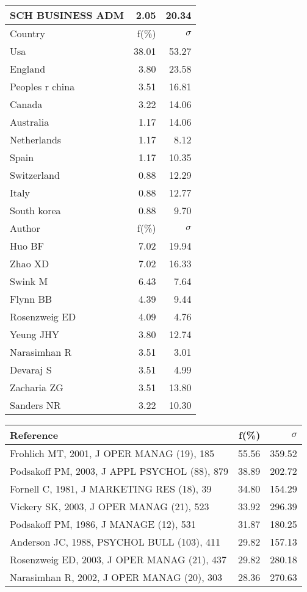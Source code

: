 \documentclass[a4paper,11pt]{report}
\begin{document}
\begin{landscape}
\begin{table}[!ht]
{\begin{tabular}{|l r r|}
SCH BUSINESS ADM & 2.05 & 20.34\\
\hline
\hline
Country & f(\%) & $\sigma$\\
\hline
Usa & 38.01 & 53.27\\
England & 3.80 & 23.58\\
Peoples r china & 3.51 & 16.81\\
Canada & 3.22 & 14.06\\
Australia & 1.17 & 14.06\\
Netherlands & 1.17 & 8.12\\
Spain & 1.17 & 10.35\\
Switzerland & 0.88 & 12.29\\
Italy & 0.88 & 12.77\\
South korea & 0.88 & 9.70\\
\hline
\hline
Author & f(\%) & $\sigma$\\
\hline
Huo BF & 7.02 & 19.94\\
Zhao XD & 7.02 & 16.33\\
Swink M & 6.43 & 7.64\\
Flynn BB & 4.39 & 9.44\\
Rosenzweig ED & 4.09 & 4.76\\
Yeung JHY & 3.80 & 12.74\\
Narasimhan R & 3.51 & 3.01\\
Devaraj S & 3.51 & 4.99\\
Zacharia ZG & 3.51 & 13.80\\
Sanders NR & 3.22 & 10.30\\
\hline
\end{tabular}
}
{\scriptsize\begin{tabular}{|l r r|}
\hline
Reference & f(\%) & $\sigma$\\
\hline
Frohlich MT, 2001, J OPER MANAG (19), 185 & 55.56 & 359.52\\
Podsakoff PM, 2003, J APPL PSYCHOL (88), 879 & 38.89 & 202.72\\
Fornell C, 1981, J MARKETING RES (18), 39 & 34.80 & 154.29\\
Vickery SK, 2003, J OPER MANAG (21), 523 & 33.92 & 296.39\\
Podsakoff PM, 1986, J MANAGE (12), 531 & 31.87 & 180.25\\
Anderson JC, 1988, PSYCHOL BULL (103), 411 & 29.82 & 157.13\\
Rosenzweig ED, 2003, J OPER MANAG (21), 437 & 29.82 & 280.18\\
Narasimhan R, 2002, J OPER MANAG (20), 303 & 28.36 & 270.63\\

\end{tabular}}
\end{table}
\end{landscape}
\end{document}
